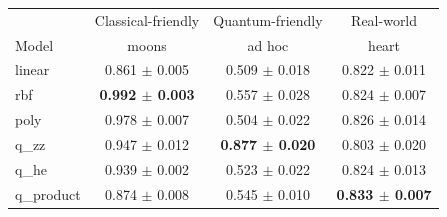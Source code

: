 \begin{tabular}{lccc}
\toprule
 & Classical-friendly & Quantum-friendly & Real-world \\
Model & moons & ad hoc & heart \\
\midrule
linear & 0.861 $\pm$ 0.005 & 0.509 $\pm$ 0.018 & 0.822 $\pm$ 0.011 \\
rbf & \textbf{0.992 $\pm$ 0.003} & 0.557 $\pm$ 0.028 & 0.824 $\pm$ 0.007 \\
poly & 0.978 $\pm$ 0.007 & 0.504 $\pm$ 0.022 & 0.826 $\pm$ 0.014 \\
\midrule
q\_zz & 0.947 $\pm$ 0.012 & \textbf{0.877 $\pm$ 0.020} & 0.803 $\pm$ 0.020 \\
q\_he & 0.939 $\pm$ 0.002 & 0.523 $\pm$ 0.022 & 0.824 $\pm$ 0.013 \\
q\_product & 0.874 $\pm$ 0.008 & 0.545 $\pm$ 0.010 & \textbf{0.833 $\pm$ 0.007} \\
\bottomrule
\end{tabular}
